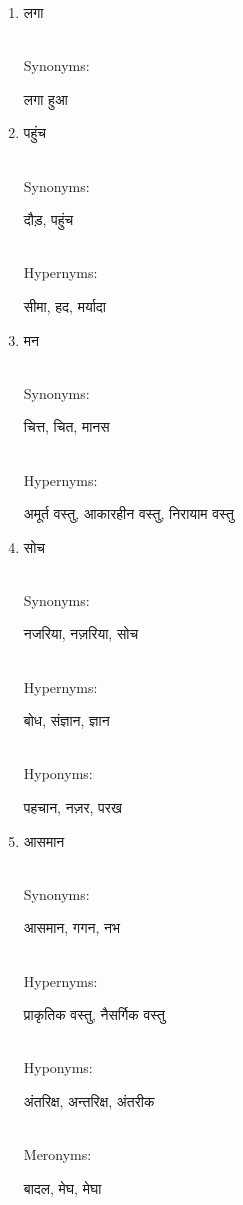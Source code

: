 \documentclass{article}
\begin{document}
\begin{enumerate}
\item \begin{hindi}लगा\end{hindi} \\
Synonyms: \begin{hindi}लगा हुआ\end{hindi}

\item \begin{hindi}पहुंच\end{hindi} \\
Synonyms: \begin{hindi}दौड़, पहुंच\end{hindi} \\
Hypernyms: \begin{hindi}सीमा, हद, मर्यादा\end{hindi}

\item \begin{hindi}मन\end{hindi} \\
Synonyms: \begin{hindi}चित्त, चित, मानस\end{hindi} \\
Hypernyms: \begin{hindi}अमूर्त वस्तु, आकारहीन वस्तु, निरायाम वस्तु\end{hindi}

\item \begin{hindi}सोच\end{hindi} \\
Synonyms: \begin{hindi}नजरिया, नज़रिया, सोच\end{hindi} \\
Hypernyms: \begin{hindi}बोध, संज्ञान, ज्ञान\end{hindi} \\
Hyponyms: \begin{hindi}पहचान, नज़र, परख\end{hindi}

\item \begin{hindi}आसमान\end{hindi} \\
Synonyms: \begin{hindi}आसमान, गगन, नभ\end{hindi} \\
Hypernyms: \begin{hindi}प्राकृतिक वस्तु, नैसर्गिक वस्तु\end{hindi} \\
Hyponyms: \begin{hindi}अंतरिक्ष, अन्तरिक्ष, अंतरीक\end{hindi} \\
Meronyms: \begin{hindi}बादल, मेघ, मेघा\end{hindi}


\end{enumerate}
\end{document}
